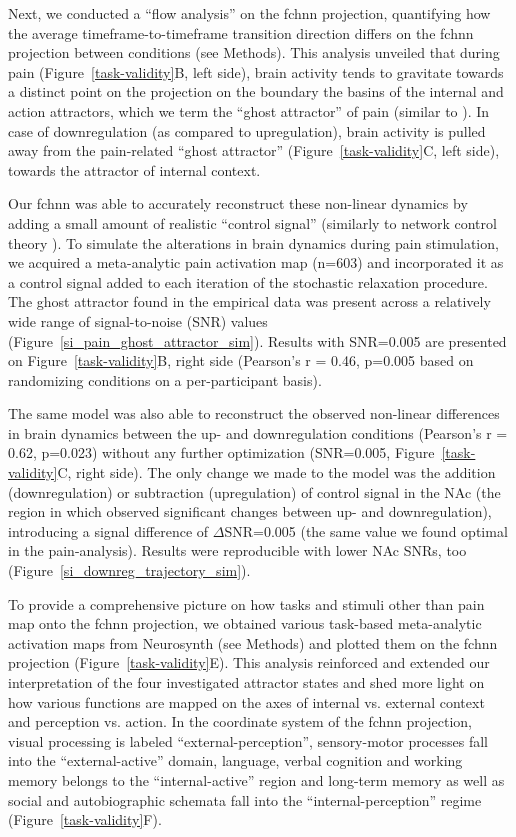 \documentclass{article}
\begin{document}
Next, we conducted a ``flow analysis'' on the \acrshort{fchnn} projection, quantifying how the average timeframe-to-timeframe transition direction differs on the \acrshort{fchnn} projection between conditions (see Methods).
This analysis unveiled that during pain (Figure~\ref{task-validity}B, left side), brain activity tends to gravitate towards a distinct point on the projection on the boundary the basins of the internal and action attractors, which we term the ``ghost attractor'' of pain (similar to \cite{vohryzek2020ghost}). In case of downregulation (as compared to upregulation), brain activity is pulled away from the pain-related ``ghost attractor'' (Figure~\ref{task-validity}C, left side), towards the attractor of internal context.

Our \acrshort{fchnn} was able to accurately reconstruct these non-linear dynamics by adding a small amount of realistic ``control signal'' (similarly to network control theory \citet{liu2011controllability, gu2015controllability}). To simulate the alterations in brain dynamics during pain stimulation, we acquired a meta-analytic pain activation map \citep{zunhammer2021meta} (n=603) and incorporated it as a control signal added to each iteration of the stochastic relaxation procedure. The ghost attractor found in the empirical data was present across a relatively wide range of signal-to-noise (SNR) values (Figure~\ref{si_pain_ghost_attractor_sim}). Results with SNR=0.005 are presented on Figure~\ref{task-validity}B, right side (Pearson's r = 0.46, p=0.005 based on randomizing conditions on a per-participant basis).

The same model was also able to reconstruct the observed non-linear differences in brain dynamics between the up- and downregulation conditions (Pearson's r = 0.62, p=0.023) without any further optimization (SNR=0.005,
Figure~\ref{task-validity}C, right side). The only change we made to the model was the addition (downregulation) or
subtraction (upregulation) of control signal in the NAc (the region in which \citep{woo2015distinct} observed significant changes between up- and downregulation), introducing a signal difference of $\Delta$SNR=0.005 (the same value we found optimal in the pain-analysis). Results were reproducible with lower NAc SNRs, too (Figure~\ref{si_downreg_trajectory_sim}).

To provide a comprehensive picture on how tasks and stimuli other than pain map onto the \acrshort{fchnn} projection, we obtained various task-based meta-analytic activation maps from Neurosynth (see Methods) and plotted them on the \acrshort{fchnn} projection (Figure~\ref{task-validity}E). This analysis reinforced and extended our interpretation of the four investigated attractor states and shed more light on how various functions are mapped on the axes of internal vs. external context and perception vs. action.
In the coordinate system of the \acrshort{fchnn} projection, visual processing is labeled ``external-perception'', sensory-motor processes fall into the ``external-active'' domain, language, verbal cognition and working memory belongs to the ``internal-active'' region and long-term memory as well as social and autobiographic schemata fall into the ``internal-perception'' regime (Figure~\ref{task-validity}F).
\end{document}
